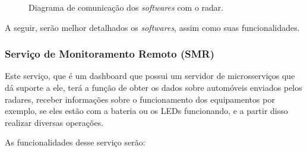 \begin{figure}[!htb]
    \caption{\label{fig:diagrama-in-out-software} Diagrama de comunicação dos \emph{softwares} com o radar.}
\end{figure}

 A seguir, serão melhor detalhados os \emph{softwares}, assim como suas funcionalidades.

\subsubsection{Serviço de Monitoramento Remoto (SMR)}
Este serviço, que é um dashboard que possui um servidor de microsserviços que dá suporte a ele, terá a função de obter os dados sobre automóveis enviados pelos radares, receber informações sobre o funcionamento dos equipamentos por exemplo, se eles estão com a bateria ou os LEDs funcionando, e a partir disso realizar diversas operações.

As funcionalidades desse serviço serão:

